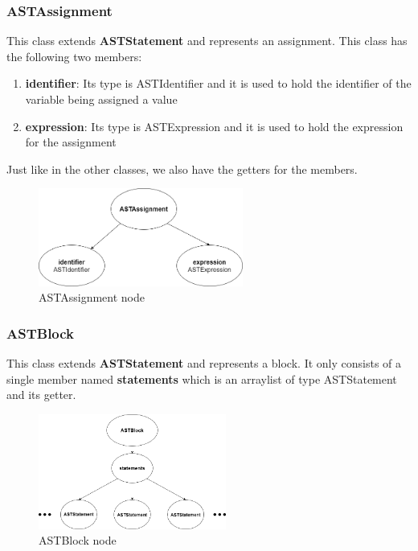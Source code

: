 \documentclass{article}
\begin{document}
					\subsubsection{ASTAssignment}
					
					This class extends \textbf{ASTStatement} and represents an assignment. This class has the following two members:
					\begin{enumerate}
					\item \textbf{identifier}: Its type is ASTIdentifier and it is used to hold the identifier of the variable being assigned a value
					\item \textbf{expression}: Its type is ASTExpression and it is used to hold the expression for the assignment
					\end{enumerate}	
					Just like in the other classes, we also have the getters for the members.
					
					
					\begin{figure}[H]
					\centering
			 			\includegraphics[width=0.6\textwidth]{astassignment.png}
			  			\caption{{ASTAssignment} node}
			  			\label{fig:astassignment}
					\end{figure}
					
					\subsubsection{ASTBlock}
					
					This class extends \textbf{ASTStatement} and represents a block. It only consists of a single member named \textbf{statements} which is an arraylist of type ASTStatement and its getter.
					
							\begin{figure}[H]
					\centering
			 			\includegraphics[width=0.55\textwidth]{astblock.png}
			  			\caption{ASTBlock node}
			  			\label{fig:astblock}
					\end{figure}
					
\end{document}
